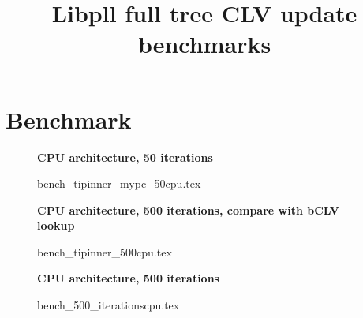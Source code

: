 \documentclass[a4paper]{article}
\begin{document}
\newcommand*{\figuretitle}[1]{%
    {\centering%
    \textbf{#1}%
    \par\medskip}%
}


\title{Libpll full tree CLV update benchmarks}
\maketitle



\section{Benchmark}


\begin{figure}[!htb]
\figuretitle{CPU architecture, 50 iterations}
{bench_tipinner_mypc_50cpu.tex}
\end{figure}


\begin{figure}[!htb]
\figuretitle{CPU architecture, 500 iterations, compare with bCLV lookup}
{bench_tipinner_500cpu.tex}
\end{figure}
\begin{figure}[!htb]
\figuretitle{CPU architecture, 500 iterations}
{bench_500_iterationscpu.tex}
\end{figure}


\end{document}
